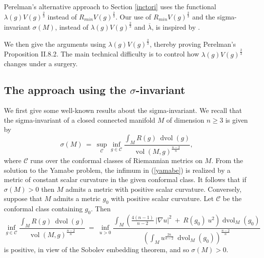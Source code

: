 \documentclass[12pt]{amsart}
\newcommand{\dvol}{\operatorname{dvol}}
\newcommand{\vol}{\operatorname{vol}}
\numberwithin{equation}{section}
\theoremstyle{plain}
\theoremstyle{definition}
\theoremstyle{remark}
\begin{document}
Perelman's alternative approach to
Section \ref{inctori} uses the functional $\lambda(g) V(g)^{\frac23}$
instead of $R_{min} V(g)^{\frac23}$. Our use of $R_{min} V(g)^{\frac23}$ and
the sigma-invariant
$\sigma(M)$, instead of $\lambda(g) V(g)^{\frac23}$ and $\overline{\lambda}$,
is inspired by \cite{Anderson2}.

We then give the arguments using $\lambda(g) V(g)^{\frac23}$,
thereby proving Perelman's Proposition II.8.2.
The main technical difficulty is to
control how $\lambda(g) V(g)^{\frac23}$ changes under a surgery.

\subsection{The approach using the $\sigma$-invariant}

We first give some well-known results about the sigma-invariant.
We recall that the sigma-invariant of a closed connected
manifold $M$ of dimension $n \ge 3$ is given by
\begin{equation} \label{yamabe}
\sigma(M) \: = \: \sup_{{\mathcal C}} \inf_{g \in {\mathcal C}}
\frac{\int_M R(g) \: \dvol(g)}{\vol(M, g)^{\frac{n-2}{n}}},
\end{equation}
where ${\mathcal C}$ runs over the conformal classes of Riemannian
metrics on $M$. 
From the solution to the Yamabe problem,
the infimum in (\ref{yamabe}) is realized by a metric of constant
scalar curvature in the given conformal class.
It follows that if $\sigma(M) > 0$ then $M$ admits a metric with
positive scalar curvature. Conversely, suppose that $M$ admits
a metric $g_0$ with positive scalar curvature. Let ${\mathcal C}$
be the conformal class containing $g_0$.  Then
\begin{equation}
\inf_{g \in {\mathcal C}}
\frac{\int_M R(g) \: \dvol(g)}{\vol(M, g)^{\frac{n-2}{n}}} \: = \: 
\inf_{u > 0} \frac{
\int_M \left(
\frac{4(n-1)}{n-2} \:  |\nabla u|^2 \: + \:
R(g_0) \: u^2 \right) \dvol_M(g_0)
}{
\left( \int_M u^{\frac{2n}{n-2}} \: \dvol_M(g_0) \right)^{\frac{n-2}{n}}}
\end{equation}
is positive, in view of the Sobolev embedding theorem, and so $\sigma(M) > 0$.
\end{document}
